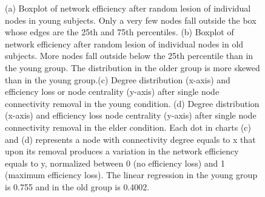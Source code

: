 \documentclass[12pt,a4paper]{article}
\begin{document}
\begin{figure}[!ht]
{    }
    \caption{\small (a) Boxplot of network efficiency after random lesion of individual nodes in young subjects. Only a very few nodes fall outside the box whose edges are the 25th and 75th percentiles. \small (b) Boxplot of network efficiency after random lesion of individual nodes  in old subjects. More nodes fall outside below the 25th percentile than in the young group. The distribution in the older group is more skewed than in the young group.\small (c) Degree distribution (x-axis) and efficiency loss or node centrality (y-axis) after single node connectivity removal in the young condition.  
  \small (d)  Degree distribution (x-axis) and efficiency loss node centrality (y-axis) after single node connectivity removal in the elder condition. Each dot in charts \small (c) and \small (d) represents a node with connectivity degree equals to x that upon its removal produces a variation in the network efficiency equals to y, normalized between 0 (no efficiency loss) and 1 (maximum efficiency loss). The linear regression in the young group is 0.755 and in the old group is 0.4002.}
    \label{fig:boxplot}
  \end{figure}
\end{document}
